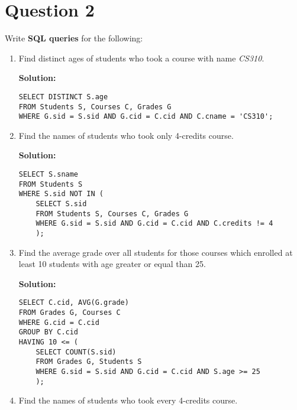 
\section*{Question 2}

Write \textbf{SQL queries} for the following:

\begin{enumerate}[label=(\alph*)]
\item Find distinct ages of students who took a course with name \textit{CS310}.

\textbf{Solution:}
\lstset{language=SQL}
\lstset{numbers=none}

\begin{lstlisting}
SELECT DISTINCT S.age
FROM Students S, Courses C, Grades G
WHERE G.sid = S.sid AND G.cid = C.cid AND C.cname = 'CS310';
\end{lstlisting}

\item Find the names of students who took only 4-credits course.

\textbf{Solution:}

\begin{lstlisting}
SELECT S.sname
FROM Students S
WHERE S.sid NOT IN (
	SELECT S.sid
	FROM Students S, Courses C, Grades G
	WHERE G.sid = S.sid AND G.cid = C.cid AND C.credits != 4
	);
\end{lstlisting}

\item Find the average grade over all students for those courses which enrolled at least 10 students with age greater or equal than 25.

\textbf{Solution:}

\begin{lstlisting}
SELECT C.cid, AVG(G.grade)
FROM Grades G, Courses C
WHERE G.cid = C.cid
GROUP BY C.cid
HAVING 10 <= (
	SELECT COUNT(S.sid)
	FROM Grades G, Students S
	WHERE G.sid = S.sid AND G.cid = C.cid AND S.age >= 25
	);
\end{lstlisting}

\item Find the names of students who took every 4-credits course.


\end{enumerate}
